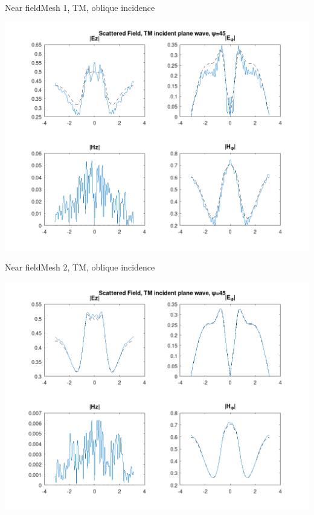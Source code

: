 
\begin{frame}{Near field}{Mesh 1, TM, oblique incidence}

\includegraphics[width=0.95\linewidth]{results/pec_y_malla_gorda_45_TM/NF.png}
  
\end{frame}
  

\begin{frame}{Near field}{Mesh 2, TM, oblique incidence}

\includegraphics[width=0.95\linewidth]{results/pec_y_malla_fina_45_TM/NF.png}
  
\end{frame}
  
